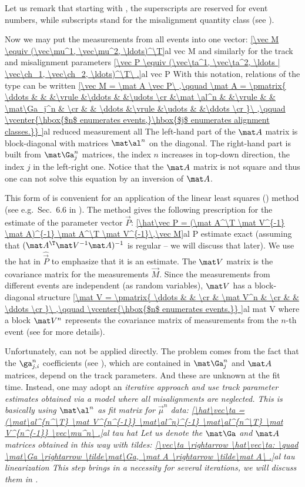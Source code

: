 Let us remark that starting with , the superscripts are reserved for event numbers, while subscripts stand for the misalignment quantity class (see ).

Now we may put the measurements from all events into one vector:
\eqref{\vec M \equiv (\vec\mu^1, \vec\mu^2, \ldots)^\T}{al vec M}
and similarly for the track and misalignment parameters
\eqref{\vec P \equiv (\vec\ta^1, \vec\ta^2, \ldots | \vec\ch_1, \vec\ch_2, \ldots)^\T\ .}{al vec P}
With this notation, relations of the type  can be written
\eqref{\vec M = \mat A \vec P\ ,\qquad
	\mat A = \pmatrix{
	\ddots & 		&		&\vrule	&\ddots	&				&\udots	\cr
		&\mat \al^n	&		&\vrule	&		& \mat\Ga_j^n	&	\cr
		&		& \ddots	&\vrule	&\udots	&				&\ddots	\cr
	}\ ,\qquad
	\vcenter{\hbox{$n$ enumerates events,}\hbox{$j$ enumerates alignment classes.}}
}{al reduced measurement all}
The left-hand part of the $\mat A$ matrix is block-diagonal with matrices $\mat\al^n$ on the diagonal. The right-hand part is built from $\mat\Ga_j^n$ matrices, the index $n$ increases in top-down direction, the index $j$ in the left-right one. Notice that the $\mat A$ matrix is not square and thus one can not solve this equation by an inversion of $\mat A$.

This form of  is convenient for an application of the linear least squares () method (see e.g.~Sec.~6.6 in ). The method gives the following prescription for the estimate of the parameter vector $\vec P$:
\eqref{\hat\vec P = (\mat A^\T \mat V^{-1} \mat A)^{-1} \mat A^\T \mat V^{-1}\,\vec M}{al P estimate exact}
(assuming that $(\mat A^\T \mat V^{-1} \mat A)^{-1}$ is regular -- we will discuss that later). We use the hat in $\hat\vec P$ to emphasize that it is an estimate. The $\mat V$ matrix is the covariance matrix for the measurements $\vec M$. Since the measurements from different events are independent (as random variables), $\mat V$ has a block-diagonal structure
\eqref{\mat V = \pmatrix{
\ddots	&			&			\cr
		& \mat V^n	&			\cr
		&			& \ddots	\cr
	}\ ,\qquad
	\vcenter{\hbox{$n$ enumerates events.}}
}{al mat V}
where a block $\mat V^n$ represents the covariance matrix of measurements from the $n$-th event (see  for more details).

Unfortunately,  can not be applied directly. The problem comes from the fact that the $\ga^n_{j,i}$ coefficients (see ), which are contained in $\mat\Ga_j^n$ and $\mat A$ matrices, depend on the track parameters. And these are unknown at the fit time. Instead, one may adopt an \em{iterative} approach and use track parameter estimates obtained via a model where all misalignments are neglected. This is basically using $\mat \al^n$ as fit matrix for $\vec \mu^n$ data:
\eqref{\hat\vec\ta = (\mat\al^{n^\T} \mat V^{n^{-1}} \mat\al^n)^{-1} \mat\al^{n^\T} \mat V^{n^{-1}} \vec\mu^n\ .}{al tau hat}
Let us denote the $\mat\Ga$ and $\mat A$ matrices obtained in this way with tildes:
\eqref{\vec\ta \rightarrow \hat\vec\ta: \quad \mat\Ga \rightarrow \tilde\mat\Ga, \mat A \rightarrow \tilde\mat A\ .}{al tau linearization}
This step brings in a necessity for several iterations, we will discuss them in .

